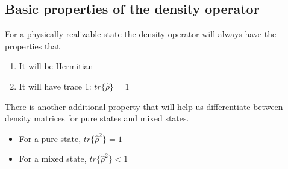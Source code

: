 \subsection{Basic properties of the density operator}
\par For a physically realizable state the density operator will always have the properties that
\begin{enumerate}
  \item It will be Hermitian
  \item It will have trace 1:
  $ tr\{\hat{\rho}\} = 1 $
\end{enumerate}
\par There is another additional property that will help us differentiate between density matrices for pure states and mixed states.
\begin{itemize}
  \item For a pure state, $ tr\{ \hat{\rho}^2 \} = 1 $
  \item For a mixed state, $ tr\{ \hat{\rho}^2 \} < 1 $
\end{itemize}

